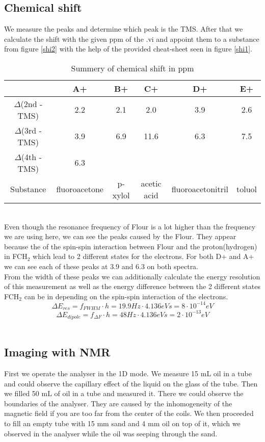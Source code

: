 \subsection{Chemical shift}\label{chemical-shift}

We measure the peaks and determine which peak is the TMS. After that we calculate the shift with the given ppm of the .vi and appoint them to a substance from figure \ref{shi2} with the help of the provided cheat-sheet seen in figure \ref{shi1}. \\
\begin{table}[h!]
\centering
\begin{tabular}{c||c|c|c|c|c}
 & A+ & B+ & C+ & D+ & E+ \\
\hline
\hline
$\Delta$(2nd - TMS) & 2.2 & 2.1 & 2.0 & 3.9 & 2.6 \\
\hline
$\Delta$(3rd - TMS) & 3.9 & 6.9 & 11.6 & 6.3 & 7.5 \\
\hline
$\Delta$(4th - TMS) & 6.3 &  &  &  & \\
\hline
\hline
Substance & fluoroacetone & p-xylol & acetic acid & fluoroacetonitril & toluol \\
\end{tabular}
\caption{Summery of chemical shift in ppm}
\label{table2}
\end{table}\\
Even though the resonance frequency of Flour is a lot higher than the frequency we are using here, we can see the peaks caused by the Flour. They appear because the of the spin-spin interaction between Flour and the proton(hydrogen) in FCH$_2$ which lead to 2 different states for the electrons. For both D+ and A+ we can see each of these peaks at 3.9 and 6.3 on both spectra.
\vspace{2mm}\\
From the width of these peaks we can additionally calculate the energy resolution of this measurement as well as the energy difference between the 2 different states FCH$_2$ can be in depending on the spin-spin interaction of the electrons.
\begin{equation}\label{E_r}
	\Delta E_{res} = f_{FWHM} \cdot h = 19.9 Hz \cdot 4.136eVs = 8 \cdot 10^{-14}eV
\end{equation}
\begin{equation}\label{E_d}
	\Delta E_{dipole} = f_{\Delta F} \cdot h = 48 Hz \cdot 4.136eVs = 2 \cdot 10^{-13}eV
\end{equation}\\
\subsection{Imaging with NMR}\label{imaging-with-nmr}
First we operate the analyser in the 1D mode. We measure 15 mL oil in a tube and could observe the capillary effect of the liquid on the glass of the tube. Then we filled 50 mL of oil in a tube and measured it. There we could observe the boundaries of the analyser. They are caused by the inhomogeneity of the magnetic field if you are too far from the center of the coils. We then proceeded to fill an empty tube with 15 mm sand and 4 mm oil on top of it, which we observed in the analyser while the oil was seeping through the sand.